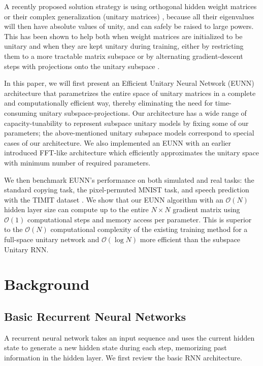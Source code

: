 A recently proposed solution strategy is using orthogonal hidden weight matrices or their complex generalization (unitary matrices) \cite{saxe2013exact,le2015simple,arjovsky2015unitary,henaff2016orthogonal}, because all their eigenvalues will then have absolute values of unity, and can safely be raised to large powers. This has been shown to help both when weight matrices are initialized to be unitary \cite{saxe2013exact,le2015simple} and when they are kept unitary during training, either by restricting them to a more tractable matrix subspace \cite{arjovsky2015unitary} or by alternating gradient-descent steps with projections onto the unitary subspace \cite{wisdom2016full}.

In this paper, we will first present an Efficient Unitary Neural Network (EUNN) architecture that parametrizes the entire space of unitary matrices in a complete and computationally efficient way, thereby eliminating the need for time-consuming unitary subspace-projections. Our architecture has a wide range of capacity-tunability to represent subspace unitary models by fixing some of our parameters; the above-mentioned unitary subspace models correspond to special cases of our architecture. We also implemented an EUNN with an earlier introduced FFT-like architecture which efficiently approximates the unitary space with minimum number of required parameters\cite{Mathieu2014Fast}.

We then benchmark EUNN's performance on both simulated and real tasks: the standard copying task, the pixel-permuted MNIST task, and speech prediction with the TIMIT dataset \cite{garofolo1993darpa}. We show that our EUNN algorithm with an $\mathcal{O}(N)$ hidden layer size can compute up to the entire $N\times N$ gradient matrix using $\mathcal{O}(1)$ computational steps and memory access per parameter. This is superior to the $\mathcal{O}(N)$ computational complexity of the existing training method for a full-space unitary network \cite{wisdom2016full} and $\mathcal{O}(\log N)$ more efficient than the subspace Unitary RNN\cite{arjovsky2015unitary}. 

\section{Background}
\subsection{Basic Recurrent Neural Networks}

A recurrent neural network takes an input sequence and uses the current hidden state to generate a new hidden state during each step, memorizing past information in the hidden layer. We first review the basic RNN architecture. 

